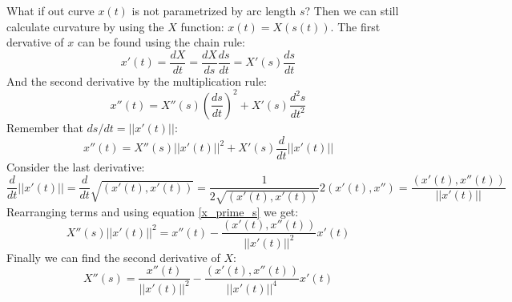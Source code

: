 \documentclass[12pt, a4paper]{article}
\numberwithin{equation}{section}
\begin{document}
What if out curve $x(t)$ is not parametrized by arc length $s$? Then we can still calculate curvature by using the $X$ function: $x(t)=X(s(t))$. The first dervative of $x$ can be found using the chain rule:
\begin{equation}
x'(t)=\frac{dX}{dt}=\frac{dX}{ds}\frac{ds}{dt}=X'(s)\frac{ds}{dt}
\end{equation}
And the second derivative by the multiplication rule:
\begin{equation}
x''(t)=X''(s)\left(\frac{ds}{dt}\right)^2+X'(s)\frac{d^2s}{dt^2}
\end{equation}
Remember that $ds/dt=||x'(t)||$:
\begin{equation}
x''(t)=X''(s)||x'(t)||^2+X'(s)\frac{d}{dt}||x'(t)||
\end{equation}
Consider the last derivative:
\begin{equation}
\frac{d}{dt}||x'(t)||=\frac{d}{dt}\sqrt{(x'(t),x'(t))}=\frac{1}{2\sqrt{(x'(t),x'(t))}}2(x'(t),x'')=\frac{(x'(t),x''(t))}{||x'(t)||}
\end{equation}
Rearranging terms and using equation \ref{x_prime_s} we get:
\begin{equation}
X''(s)||x'(t)||^2=x''(t)-\frac{(x'(t),x''(t))}{||x'(t)||^2}x'(t)
\end{equation}
Finally we can find the second derivative of $X$:
\begin{equation}
X''(s)=\frac{x''(t)}{||x'(t)||^2}-\frac{(x'(t),x''(t))}{||x'(t)||^4}x'(t)
\end{equation}
\end{document}
